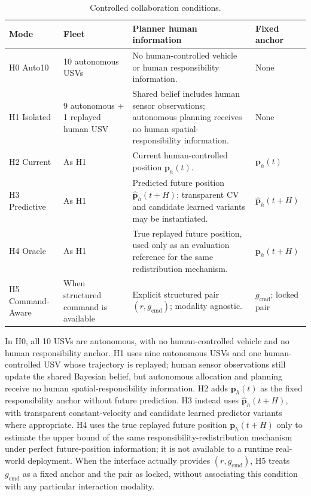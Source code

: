 \documentclass[letterpaper, 10pt, conference]{ieeeconf}
\begin{document}
\begin{table}[t]
  \caption{Controlled collaboration conditions.}
  \label{tab:collaboration_conditions}
  \centering
  \begin{tabular}{p{1.00in} p{1.05in} p{2.90in} p{1.25in}}
    \hline
    \textbf{Mode} & \textbf{Fleet} & \textbf{Planner human information} & \textbf{Fixed anchor} \\
    \hline
    H0 Auto10 & 10 autonomous USVs & No human-controlled vehicle or human responsibility information. & None \\
    H1 Isolated & 9 autonomous + 1 replayed human USV & Shared belief includes human sensor observations; autonomous planning receives no human spatial-responsibility information. & None \\
    H2 Current & As H1 & Current human-controlled position \(\mathbf{p}_h(t)\). & \(\mathbf{p}_h(t)\) \\
    H3 Predictive & As H1 & Predicted future position \(\hat{\mathbf{p}}_h(t+H)\); transparent CV and candidate learned variants may be instantiated. & \(\hat{\mathbf{p}}_h(t+H)\) \\
    H4 Oracle & As H1 & True replayed future position, used only as an evaluation reference for the same redistribution mechanism. & \(\mathbf{p}_h(t+H)\) \\
    H5 Command-Aware & When structured command is available & Explicit structured pair \((r,g_{\mathrm{cmd}})\); modality agnostic. & \(g_{\mathrm{cmd}}\); locked pair \\
    \hline
  \end{tabular}
\end{table}

In H0, all 10 USVs are autonomous, with no human-controlled vehicle and no human responsibility anchor. H1 uses nine autonomous USVs and one human-controlled USV whose trajectory is replayed; human sensor observations still update the shared Bayesian belief, but autonomous allocation and planning receive no human spatial-responsibility information. H2 adds \(\mathbf{p}_h(t)\) as the fixed responsibility anchor without future prediction. H3 instead uses \(\hat{\mathbf{p}}_h(t+H)\), with transparent constant-velocity and candidate learned predictor variants where appropriate. H4 uses the true replayed future position \(\mathbf{p}_h(t+H)\) only to estimate the upper bound of the same responsibility-redistribution mechanism under perfect future-position information; it is not available to a runtime real-world deployment. When the interface actually provides \((r,g_{\mathrm{cmd}})\), H5 treats \(g_{\mathrm{cmd}}\) as a fixed anchor and the pair as locked, without associating this condition with any particular interaction modality.
\end{document}
